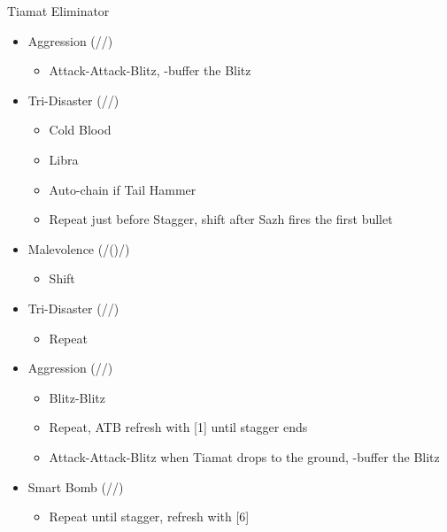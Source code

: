 \begin{multicols}{2}
\begin{menu}
  \end{menu}
  \renewcommand{\first}{[1] Tireless Charge ((\com)/\com/\med)}
  \renewcommand{\second}{[2] Aggression (\com/\com/\rav)}
  \renewcommand{\third}{[3] Consolidation (\sen/\sen/\med)}
  \renewcommand{\fourth}{[4] Malevolence (\syn/(\rav)/\rav)}
  \renewcommand{\fifth}{[5] Smart Bomb (\rav/\rav/\sab)}
  \renewcommand{\sixth}{[6] Tri-Disaster (\rav/\rav/\rav)}
  \begin{battle}{Tiamat Eliminator}
    \begin{itemize}
      \item \second
            \begin{itemize}
              \item Attack-Attack-Blitz, \rav-buffer the Blitz
            \end{itemize}
      \item \sixth
            \begin{itemize}
              \item Cold Blood
              \item Libra
              \item Auto-chain if Tail Hammer
              \item Repeat just before Stagger, shift after Sazh fires the first bullet
            \end{itemize}
      \item \fourth
            \begin{itemize}
              \item Shift
            \end{itemize}
      \item \sixth
            \begin{itemize}
              \item Repeat
            \end{itemize}
      \item \second
            \begin{itemize}
              \item Blitz-Blitz
              \item Repeat, ATB refresh with [1] until stagger ends
              \item Attack-Attack-Blitz when Tiamat drops to the ground, \rav-buffer the Blitz
            \end{itemize}
      \item \fifth
            \begin{itemize}
              \item Repeat until stagger, refresh with [6]

\end{itemize}
\end{itemize}
\end{battle}
\end{multicols}
